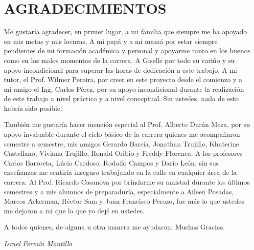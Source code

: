 \chapter*{AGRADECIMIENTOS}

Me gustaría agradecer, en primer lugar, a mi familia que siempre me ha apoyado en mis metas y mis locuras. A mi papá y a mi mamá por estar siempre pendientes de mi formación académica y personal y apoyarme tanto en los buenos como en los malos momentos de la carrera. A Giselle por todo su cariño y su apoyo incondicional para superar las horas de dedicación a este trabajo. A mi tutor, el Prof. Wilmer Pereira, por creer en este proyecto desde el comienzo y a mi amigo el Ing. Carlos Pérez, por su apoyo incondicional durante la realización de este trabajo a nivel práctico y a nivel conceptual. Sin ustedes, nada de esto habría sido posible.

También me gustaría hacer mención especial al Prof. Alberto Durán Meza, por su apoyo invaluable durante el ciclo básico de la carrera quienes me acompañaron semestre a semestre, mis amigos Gerardo Barcia, Jonathan Trujillo, Khaterine Castellano, Viviana Trujillo, Ronald Oribio y Freddy Florenca. A los profesores Carlos Barroeta, Lúcia Cardoso, Rodolfo Campos y Darío León, sin sus enseñanzas me sentiría inseguro trabajando en la calle en cualquier área de la carrera. Al Prof. Ricardo Casanova por brindarme su amistad durante los últimos semestres y a mis alumnos de preparaduría, especialmente a Aileen Posadas, Marcos Ackerman, Héctor Sam y Juan Francisco Perozo, fue más lo que ustedes me dejaron a mi que lo que yo dejé en ustedes.

A todos quienes, de alguna u otra manera me ayudaron,
Muchas Gracias.


\begin{flushright}
\textit{Israel Fermín Montilla}
\end{flushright}
